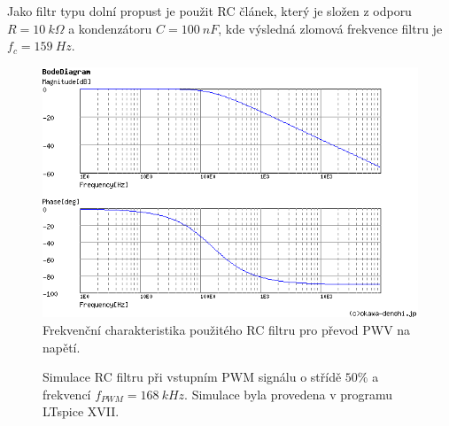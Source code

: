 Jako filtr typu dolní propust je použit RC článek, který je složen z odporu $R = 10 \ k\Omega$ a kondenzátoru $C = 100 \ nF$, kde výsledná zlomová frekvence filtru je $f_c = 159 \ Hz$.

\begin{figure}[H]
    \centering
    \includegraphics[width=1\linewidth]{pictures/var_rc_filter.png}
    \caption{Frekvenční charakteristika použitého RC filtru pro převod PWV na napětí.\cite{cite:RCResponse}}
    \label{fig:var_rc_filter_char}
\end{figure}

\begin{figure}[H]
    \caption{Simulace RC filtru při vstupním PWM signálu o střídě $50\%$ a frekvencí $f_{PWM} = 168 \ kHz $. Simulace byla provedena v programu LTspice XVII.}
    \label{fig:filtered_pwm}
\end{figure}


